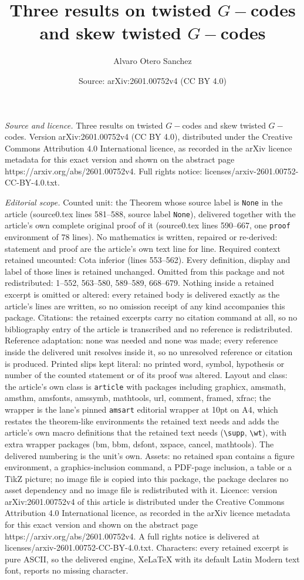 \documentclass[10pt,a4paper]{amsart}
\title[Three results on twisted $G-$codes and skew twisted $G-$code]{Three results on twisted $G-$codes and skew twisted $G-$codes}
\author{Alvaro Otero Sanchez}
\date{Source: arXiv:2601.00752v4 (CC BY 4.0)}
\begin{document}
\maketitle

\noindent\emph{Source and licence.} Three results on twisted $G-$codes and skew twisted $G-$codes. Version arXiv:2601.00752v4 (CC BY 4.0), distributed under the Creative Commons Attribution 4.0 International licence, as recorded in the arXiv licence metadata for this exact version and shown on the abstract page https://arxiv.org/abs/2601.00752v4. Full rights notice: licenses/arxiv-2601.00752-CC-BY-4.0.txt.\par\smallskip

\noindent\textit{Editorial scope.} Counted unit: the Theorem whose source label is \texttt{None} in the article (source0.tex lines 581--588, source label \texttt{None}), delivered together with the article's own complete original proof of it (source0.tex lines 590--667, one \texttt{proof} environment of 78 lines). No mathematics is written, repaired or re-derived: statement and proof are the article's own text line for line. Required context retained uncounted: Cota inferior (lines 553--562). Every definition, display and label of those lines is retained unchanged. Omitted from this package and not redistributed: 1--552, 563--580, 589--589, 668--679. Nothing inside a retained excerpt is omitted or altered: every retained body is delivered exactly as the article's lines are written, so no omission receipt of any kind accompanies this package. Citations: the retained excerpts carry no citation command at all, so no bibliography entry of the article is transcribed and no reference is redistributed. Reference adaptation: none was needed and none was made; every reference inside the delivered unit resolves inside it, so no unresolved reference or citation is produced. Printed slips kept literal: no printed word, symbol, hypothesis or number of the counted statement or of its proof was altered. Layout and class: the article's own class is \texttt{article} with packages including graphicx, amsmath, amsthm, amsfonts, amssymb, mathtools, url, comment, framed, xfrac; the wrapper is the lane's pinned \texttt{amsart} editorial wrapper at 10pt on A4, which restates the theorem-like environments the retained text needs and adds the article's own macro definitions that the retained text needs (\texttt{\textbackslash supp}, \texttt{\textbackslash wt}), with extra wrapper packages (bm, bbm, dsfont, xspace, cancel, mathtools). The delivered numbering is the unit's own. Assets: no retained span contains a figure environment, a graphics-inclusion command, a PDF-page inclusion, a table or a TikZ picture; no image file is copied into this package, the package declares no asset dependency and no image file is redistributed with it. Licence: version arXiv:2601.00752v4 of this article is distributed under the Creative Commons Attribution 4.0 International licence, as recorded in the arXiv licence metadata for this exact version and shown on the abstract page https://arxiv.org/abs/2601.00752v4. A full rights notice is delivered at licenses/arxiv-2601.00752-CC-BY-4.0.txt. Characters: every retained excerpt is pure ASCII, so the delivered engine, XeLaTeX with its default Latin Modern text font, reports no missing character.
\end{document}
